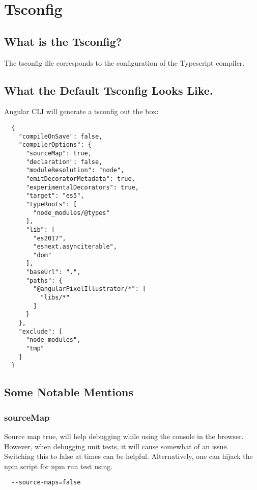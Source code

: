 \maketitle{}
\section{ Tsconfig }

\subsection{ What is the Tsconfig? }
The tsconfig file corresponds to the configuration of the Typescript compiler.

\subsection{ What the Default Tsconfig Looks Like. }
Angular CLI will generate a tsconfig out the box:
\begin{lstlisting}
  {
    "compileOnSave": false,
    "compilerOptions": {
      "sourceMap": true,
      "declaration": false,
      "moduleResolution": "node",
      "emitDecoratorMetadata": true,
      "experimentalDecorators": true,
      "target": "es5",
      "typeRoots": [
        "node_modules/@types"
      ],
      "lib": [
        "es2017",
        "esnext.asynciterable",
        "dom"
      ],
      "baseUrl": ".",
      "paths": {
        "@angularPixelIllustrator/*": [
          "libs/*"
        ]
      }
    },
    "exclude": [
      "node_modules",
      "tmp"
    ]
  }
\end{lstlisting}


\subsection{ Some Notable Mentions }

\subsubsection{ sourceMap }
Source map true, will help debugging while using the console in the browser.
However, when debugging unit tests, it will cause somewhat of an issue.
Switching this to false at times can be helpful. Alternatively, one can hijack
the npm script for npm run test using. 
\begin{verbatim}
  --source-maps=false
\end{verbatim}
